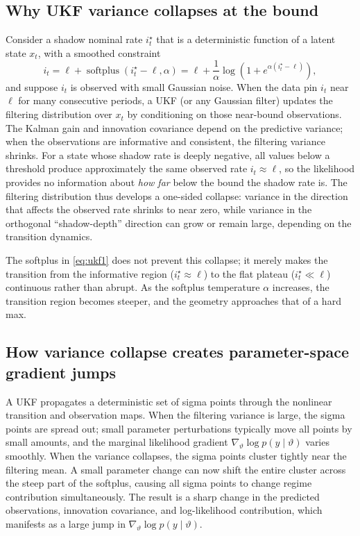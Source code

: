 \documentclass[11pt]{article}
\begin{document}
\subsection{Why UKF variance collapses at the bound}\label{sec:ukf-collapse-mechanism}

Consider a shadow nominal rate $i_t^\star$ that is a deterministic function of
a latent state $x_t$, with a smoothed constraint
\begin{equation}\label{eq:ukf1}
 i_t = \ell + \operatorname{softplus}(i_t^\star - \ell, \alpha)
     = \ell + \frac{1}{\alpha}\log(1 + e^{\alpha(i_t^\star-\ell)}),
\end{equation}
and suppose $i_t$ is observed with small Gaussian noise. When the data pin
$i_t$ near $\ell$ for many consecutive periods, a UKF (or any Gaussian filter)
updates the filtering distribution over $x_t$ by conditioning on those
near-bound observations. The Kalman gain and innovation covariance depend on
the predictive variance; when the observations are informative and consistent,
the filtering variance shrinks. For a state whose shadow rate is deeply
negative, all values below a threshold produce approximately the same observed
rate $i_t\approx\ell$, so the likelihood provides no information about
\emph{how far} below the bound the shadow rate is. The filtering distribution
thus develops a one-sided collapse: variance in the direction that affects the
observed rate shrinks to near zero, while variance in the orthogonal
``shadow-depth'' direction can grow or remain large, depending on the
transition dynamics.

The softplus in \eqref{eq:ukf1} does not prevent this collapse; it merely
makes the transition from the informative region ($i_t^\star\approx\ell$) to
the flat plateau ($i_t^\star\ll\ell$) continuous rather than abrupt. As the
softplus temperature $\alpha$ increases, the transition region becomes
steeper, and the geometry approaches that of a hard max.

\subsection{How variance collapse creates parameter-space gradient jumps}\label{sec:collapse-gradient}

A UKF propagates a deterministic set of sigma points through the nonlinear
transition and observation maps. When the filtering variance is large, the
sigma points are spread out; small parameter perturbations typically move all
points by small amounts, and the marginal likelihood gradient
$\nabla_\vartheta\log p(y\mid\vartheta)$ varies smoothly. When the variance
collapses, the sigma points cluster tightly near the filtering mean. A small
parameter change can now shift the entire cluster across the steep part of the
softplus, causing all sigma points to change regime contribution
simultaneously. The result is a sharp change in the predicted observations,
innovation covariance, and log-likelihood contribution, which manifests as a
large jump in $\nabla_\vartheta\log p(y\mid\vartheta)$.
\end{document}
